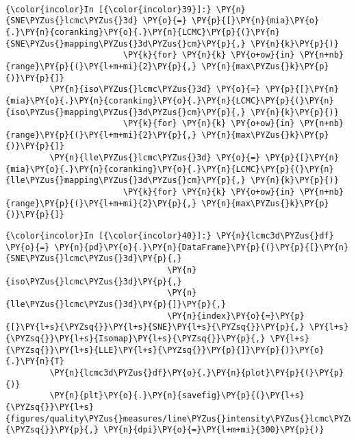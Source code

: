    \begin{center}
    \end{center}
    { \hspace*{\fill} \\}

    \begin{Verbatim}[commandchars=\\\{\}]
{\color{incolor}In [{\color{incolor}39}]:} \PY{n}{SNE\PYZus{}lcmc\PYZus{}3d} \PY{o}{=} \PY{p}{[}\PY{n}{mia}\PY{o}{.}\PY{n}{coranking}\PY{o}{.}\PY{n}{LCMC}\PY{p}{(}\PY{n}{SNE\PYZus{}mapping\PYZus{}3d\PYZus{}cm}\PY{p}{,} \PY{n}{k}\PY{p}{)}
                        \PY{k}{for} \PY{n}{k} \PY{o+ow}{in} \PY{n+nb}{range}\PY{p}{(}\PY{l+m+mi}{2}\PY{p}{,} \PY{n}{max\PYZus{}k}\PY{p}{)}\PY{p}{]}
         \PY{n}{iso\PYZus{}lcmc\PYZus{}3d} \PY{o}{=} \PY{p}{[}\PY{n}{mia}\PY{o}{.}\PY{n}{coranking}\PY{o}{.}\PY{n}{LCMC}\PY{p}{(}\PY{n}{iso\PYZus{}mapping\PYZus{}3d\PYZus{}cm}\PY{p}{,} \PY{n}{k}\PY{p}{)}
                        \PY{k}{for} \PY{n}{k} \PY{o+ow}{in} \PY{n+nb}{range}\PY{p}{(}\PY{l+m+mi}{2}\PY{p}{,} \PY{n}{max\PYZus{}k}\PY{p}{)}\PY{p}{]}
         \PY{n}{lle\PYZus{}lcmc\PYZus{}3d} \PY{o}{=} \PY{p}{[}\PY{n}{mia}\PY{o}{.}\PY{n}{coranking}\PY{o}{.}\PY{n}{LCMC}\PY{p}{(}\PY{n}{lle\PYZus{}mapping\PYZus{}3d\PYZus{}cm}\PY{p}{,} \PY{n}{k}\PY{p}{)}
                        \PY{k}{for} \PY{n}{k} \PY{o+ow}{in} \PY{n+nb}{range}\PY{p}{(}\PY{l+m+mi}{2}\PY{p}{,} \PY{n}{max\PYZus{}k}\PY{p}{)}\PY{p}{]}
\end{Verbatim}

    \begin{Verbatim}[commandchars=\\\{\}]
{\color{incolor}In [{\color{incolor}40}]:} \PY{n}{lcmc3d\PYZus{}df} \PY{o}{=} \PY{n}{pd}\PY{o}{.}\PY{n}{DataFrame}\PY{p}{(}\PY{p}{[}\PY{n}{SNE\PYZus{}lcmc\PYZus{}3d}\PY{p}{,}
                                 \PY{n}{iso\PYZus{}lcmc\PYZus{}3d}\PY{p}{,}
                                 \PY{n}{lle\PYZus{}lcmc\PYZus{}3d}\PY{p}{]}\PY{p}{,}
                                 \PY{n}{index}\PY{o}{=}\PY{p}{[}\PY{l+s}{\PYZsq{}}\PY{l+s}{SNE}\PY{l+s}{\PYZsq{}}\PY{p}{,} \PY{l+s}{\PYZsq{}}\PY{l+s}{Isomap}\PY{l+s}{\PYZsq{}}\PY{p}{,} \PY{l+s}{\PYZsq{}}\PY{l+s}{LLE}\PY{l+s}{\PYZsq{}}\PY{p}{]}\PY{p}{)}\PY{o}{.}\PY{n}{T}
         \PY{n}{lcmc3d\PYZus{}df}\PY{o}{.}\PY{n}{plot}\PY{p}{(}\PY{p}{)}
         \PY{n}{plt}\PY{o}{.}\PY{n}{savefig}\PY{p}{(}\PY{l+s}{\PYZsq{}}\PY{l+s}{figures/quality\PYZus{}measures/line\PYZus{}intensity\PYZus{}lcmc\PYZus{}3d.png}\PY{l+s}{\PYZsq{}}\PY{p}{,} \PY{n}{dpi}\PY{o}{=}\PY{l+m+mi}{300}\PY{p}{)}
\end{Verbatim}

